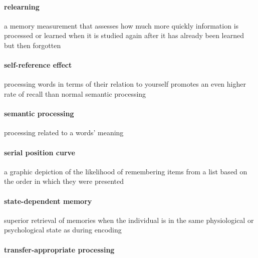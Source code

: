 \documentclass[
]{krantz}
\begin{document}
\paragraph*{relearning}\label{relearning}

a memory measurement that assesses how much more quickly information is processed or learned when it is studied again after it has already been learned but then forgotten

\paragraph*{self-reference effect}\label{self-reference-effect}

processing words in terms of their relation to yourself promotes an even higher rate of recall than normal semantic processing

\paragraph*{semantic processing}\label{semantic-processing}

processing related to a words' meaning

\paragraph*{serial position curve}\label{serial-position-curve}

a graphic depiction of the likelihood of remembering items from a list based on the order in which they were presented

\paragraph*{state-dependent memory}\label{state-dependent-memory}

superior retrieval of memories when the individual is in the same physiological or psychological state as during encoding

\paragraph*{transfer-appropriate processing}\label{transfer-appropriate-processing}
\end{document}
